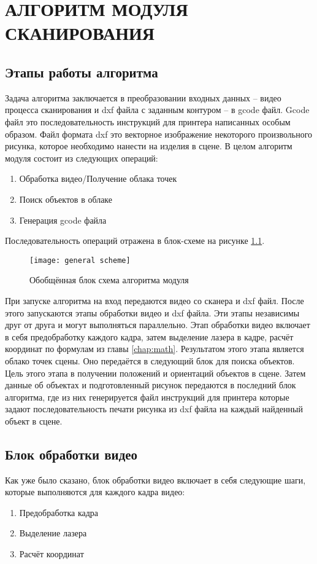 \chapter{АЛГОРИТМ МОДУЛЯ СКАНИРОВАНИЯ}\label{chap:algorithms}
    \section{Этапы работы алгоритма}
        Задача алгоритма заключается в преобразовании входных данных -- видео процесса сканирования и dxf файла с заданным контуром -- в gcode файл. Gcode файл это последовательность инструкций для принтера написанных особым образом. Файл формата dxf это векторное изображение некоторого произвольного рисунка, которое необходимо нанести на изделия в сцене.
        В целом алгоритм модуля состоит из следующих операций:
        \begin{enumerate}
            \item Обработка видео/Получение облака точек
            \item Поиск объектов в облаке
            \item Генерация gcode файла
        \end{enumerate}
        
        Последовательность операций отражена в блок-схеме на рисунке \ref{pic:general_scheme}.
        \begin{figure}[!ht]
            \centering
            \texttt{[image: general scheme]}
            \caption{Обобщённая блок схема алгоритма модуля}
            \label{pic:general_scheme}
        \end{figure}
         При запуске алгоритма на вход передаются видео со сканера и dxf файл. После этого запускаются этапы обработки видео и dxf файла. Эти этапы независимы друг от друга и могут выполняться параллельно. Этап обработки видео включает в себя предобработку каждого кадра, затем выделение лазера в кадре, расчёт координат по формулам из главы \ref{chap:math}. Результатом этого этапа является облако точек сцены. Оно передаётся в следующий блок для поиска объектов. Цель этого этапа в получении положений и ориентаций объектов в сцене. Затем данные об объектах и подготовленный рисунок передаются в последний блок алгоритма, где из них генерируется файл инструкций для принтера которые задают последовательность печати рисунка из dxf файла на каждый найденный объект в сцене.
    \section{Блок обработки видео}
        Как уже было сказано, блок обработки видео включает в себя следующие шаги, которые выполняются для каждого кадра видео:
        \begin{enumerate}
            \item Предобработка кадра
            \item Выделение лазера
            \item Расчёт координат
        \end{enumerate}
        
